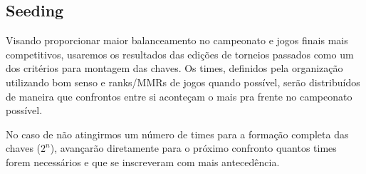 \subsection{Seeding}

Visando proporcionar maior balanceamento no campeonato e jogos finais mais competitivos, usaremos os resultados das edições de torneios passados como um dos critérios para montagem das chaves. Os times, definidos pela organização utilizando bom senso e ranks/MMRs de jogos quando possível, serão distribuídos de maneira que confrontos entre si aconteçam o mais pra frente no campeonato possível.

No caso de não atingirmos um número de times para a formação completa das chaves (\(2^n\)), avançarão diretamente para o próximo confronto quantos times forem necessários e que se inscreveram com mais antecedência.
